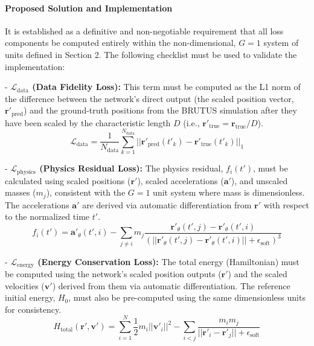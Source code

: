 \documentclass[11pt, a4paper]{article}
\begin{document}
\paragraph{Proposed Solution and Imple\-mentation}
It is established as a definitive and non-negotiable requirement that all loss components be computed entirely within the non-dimensional, $G=1$ system of units defined in Section 2. The following checklist must be used to validate the implementation:

    
- \textbf{$\mathcal{L}_{\text{data}}$ (Data Fidelity Loss):} This term must be computed as the L1 norm of the difference between the network's direct output (the scaled position vector, $\mathbf{r}'_{\text{pred}}$) and the ground-truth positions from the BRUTUS simulation after they have been scaled by the characteristic length $D$ (i.e., $\mathbf{r}'_{\text{true}} = \mathbf{r}_{\text{true}} / D$).
    \begin{equation}
        \mathcal{L}_{\text{data}} = \frac{1}{N_{\text{data}}} \sum_{k=1}^{N_{\text{data}}} ||\mathbf{r}'_{\text{pred}}(t'_k) - \mathbf{r}'_{\text{true}}(t'_k)||_1
    \end{equation}
    
- \textbf{$\mathcal{L}_{\text{physics}}$ (Physics Residual Loss):} The physics residual, $f_i(t')$, must be calculated using scaled positions ($\mathbf{r}'$), scaled accelerations ($\mathbf{a}'$), and unscaled masses ($m_j$), consistent with the $G=1$ unit system where mass is dimensionless. The accelerations $\mathbf{a}'$ are derived via automatic differentiation from $\mathbf{r}'$ with respect to the normalized time $t'$.
    \begin{equation}
        f_i(t') = \mathbf{a}'_{\theta}(t', i) - \sum_{j \neq i} m_j \frac{\mathbf{r}'_{\theta}(t', j) - \mathbf{r}'_{\theta}(t', i)}{(||\mathbf{r}'_{\theta}(t', j) - \mathbf{r}'_{\theta}(t', i)|| + \epsilon_{\text{soft}})^3}
    \end{equation}
    
- \textbf{$\mathcal{L}_{\text{energy}}$ (Energy Conservation Loss):} The total energy (Hamiltonian) must be computed using the network's scaled position outputs ($\mathbf{r}'$) and the scaled velocities ($\mathbf{v}'$) derived from them via automatic differentiation. The reference initial energy, $H_0$, must also be pre-computed using the same dimensionless units for consistency.
    \begin{equation}
        H_{\text{total}}(\mathbf{r}', \mathbf{v}') = \sum_{i=1}^{N} \frac{1}{2} m_i ||\mathbf{v}'_i||^2 - \sum_{i<j} \frac{m_i m_j}{||\mathbf{r}'_i - \mathbf{r}'_j|| + \epsilon_{\text{soft}}}
    \end{equation}
\end{document}
